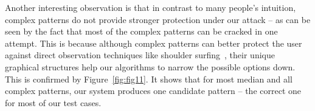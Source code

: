         Another interesting observation is that in contrast to many people's
        intuition, complex patterns do not provide stronger protection under our attack -- as can be seen by the fact that
        most of the complex patterns can be cracked in one attempt.
        This is because although complex patterns can better protect the user against direct observation techniques like shoulder surfing~\cite{shoulder}, their unique graphical structures
        help our algorithms to narrow the possible options down. This is
        confirmed by Figure~\ref{fig:fig11}. It shows that for most median and all complex patterns, our system produces one candidate pattern --
        the correct one for most of our test cases.




        \begin{figure}[!t]
            \centering
\end{figure}
